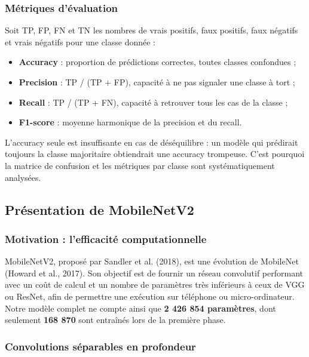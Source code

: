 \documentclass[10pt,a4paper]{article}
\begin{document}
\subsubsection{Métriques d'évaluation}

Soit TP, FP, FN et TN les nombres de vrais positifs, faux positifs, faux négatifs et vrais négatifs pour une classe donnée :

\begin{itemize}
\item \textbf{Accuracy} : proportion de prédictions correctes, toutes classes confondues ;
\item \textbf{Precision} : TP / (TP + FP), capacité à ne pas signaler une classe à tort ;
\item \textbf{Recall} : TP / (TP + FN), capacité à retrouver tous les cas de la classe ;
\item \textbf{F1-score} : moyenne harmonique de la precision et du recall.
\end{itemize}

L'accuracy seule est insuffisante en cas de déséquilibre : un modèle qui prédirait toujours la classe majoritaire obtiendrait une accuracy trompeuse. C'est pourquoi la matrice de confusion et les métriques par classe sont systématiquement analysées.

\subsection{Présentation de MobileNetV2}

\subsubsection{Motivation : l'efficacité computationnelle}

MobileNetV2, proposé par Sandler et al. (2018), est une évolution de MobileNet (Howard et al., 2017). Son objectif est de fournir un réseau convolutif performant avec un coût de calcul et un nombre de paramètres très inférieurs à ceux de VGG ou ResNet, afin de permettre une exécution sur téléphone ou micro-ordinateur. Notre modèle complet ne compte ainsi que \textbf{2 426 854 paramètres}, dont seulement \textbf{168 870} sont entraînés lors de la première phase.

\subsubsection{Convolutions séparables en profondeur}
\end{document}
